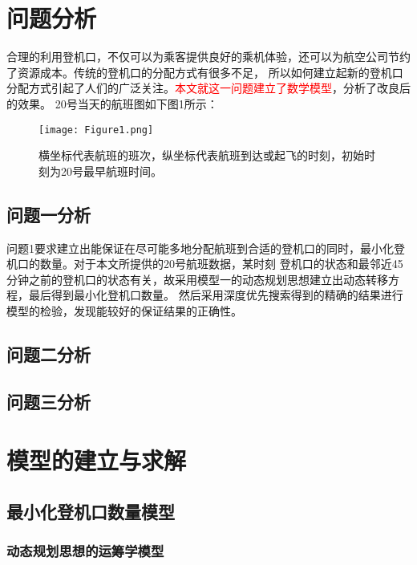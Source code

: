 \documentclass[bwprint]{gmcmthesis}
\begin{document}
\section{问题分析}
合理的利用登机口，不仅可以为乘客提供良好的乘机体验，还可以为航空公司节约了资源成本。传统的登机口的分配方式有很多不足，
所以如何建立起新的登机口分配方式引起了人们的广泛关注。\textcolor{red}{本文就这一问题建立了数学模型}，分析了改良后的效果。
20号当天的航班图如下图1所示：
\begin{figure}[!h]
\centering
\texttt{[image: Figure1.png]}
\caption{
横坐标代表航班的班次，纵坐标代表航班到达或起飞的时刻，初始时刻为20号最早航班时间。}
\end{figure}

\subsection{问题一分析}
问题1要求建立出能保证在尽可能多地分配航班到合适的登机口的同时，最小化登机口的数量。对于本文所提供的20号航班数据，某时刻
登机口的状态和最邻近45分钟之前的登机口的状态有关，故采用模型一的动态规划思想建立出动态转移方程，最后得到最小化登机口数量。
然后采用深度优先搜索得到的精确的结果进行模型的检验，发现能较好的保证结果的正确性。
\subsection{问题二分析}

\subsection{问题三分析}

\section{模型的建立与求解}

\subsection{最小化登机口数量模型}
\subsubsection{动态规划思想的运筹学模型}

\end{document}
